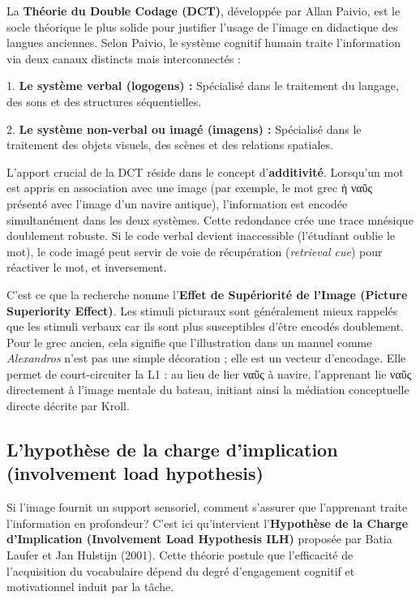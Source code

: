 La \textbf{Théorie du Double Codage (DCT)}, développée par Allan Paivio, est le socle théorique le
plus solide pour justifier l'usage de l'image en didactique des langues anciennes. Selon Paivio, le
système cognitif humain traite l'information via deux canaux distincts mais interconnectés :

1. \textbf{Le système verbal (logogens) :} Spécialisé dans le traitement du langage, des sons et des
structures séquentielles.

2. \textbf{Le système non-verbal ou imagé (imagens) :} Spécialisé dans le traitement des objets
visuels, des scènes et des relations spatiales.\cite{III-1-3-ref18}

L'apport crucial de la DCT réside dans le concept d'\textbf{additivité}. Lorsqu'un mot est appris en
association avec une image (par exemple, le mot grec ἡ ναῦς présenté avec l'image d'un navire
antique), l'information est encodée simultanément dans les deux systèmes. Cette redondance crée une
trace mnésique doublement robuste. Si le code verbal devient inaccessible (l'étudiant oublie le
mot), le code imagé peut servir de voie de récupération (\textit{retrieval cue}) pour réactiver le
mot, et inversement.\cite{III-1-3-ref20}

C'est ce que la recherche nomme l'\textbf{Effet de Supériorité de l'Image (Picture Superiority
Effect)}. Les stimuli picturaux sont généralement mieux rappelés que les stimuli verbaux car ils
sont plus susceptibles d'être encodés doublement.\cite{III-1-3-ref22} Pour le grec ancien, cela
signifie que l'illustration dans un manuel comme \textit{Alexandros} n'est pas une simple décoration
; elle est un vecteur d'encodage. Elle permet de court-circuiter la L1 : au lieu de lier ναῦς à \og
navire\fg{}, l'apprenant lie ναῦς directement à l'image mentale du bateau, initiant ainsi la
médiation conceptuelle directe décrite par Kroll.



\subsection{L'hypothèse de la charge d'implication (involvement load hypothesis)}

Si l'image fournit un support sensoriel, comment s'assurer que l'apprenant traite l'information en
profondeur? C'est ici qu'intervient l'\textbf{Hypothèse de la Charge d'Implication (Involvement Load
Hypothesis \- ILH)} proposée par Batia Laufer et Jan Hulstijn (2001). Cette théorie postule que
l'efficacité de l'acquisition du vocabulaire dépend du degré d'engagement cognitif et motivationnel
induit par la tâche.\cite{III-1-3-ref24}

